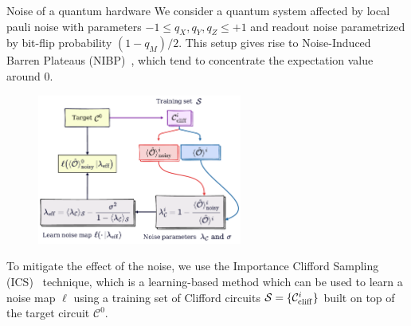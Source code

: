 \documentclass[20pt, final]{beamer}
\newlength{\colwidth}
\begin{document}
\begin{frame}[t]
\begin{columns}[t]
\begin{column}{\colwidth}
\begin{block}{Noise of a quantum hardware}
We consider a quantum system affected by local pauli noise with parameters 
$-1 \leq q_X, q_Y, q_Z \leq +1$ and readout noise parametrized by bit-flip probability 
$(1-q_M)/2$. This setup gives rise to Noise-Induced Barren Plateaus (NIBP)~\cite{nibp}, which tend 
to concentrate the expectation value around 0. 
    \begin{figure}
    \includegraphics[width=0.6\textwidth]{figures/ics.pdf}%
    \end{figure}
To mitigate the effect of the noise, we use the Importance Clifford Sampling (ICS)~\cite{ics}
technique, which is a learning-based method which can be used to learn a noise 
map $\ell$ using a training set of Clifford circuits $\mathcal{S}=\{\mathcal{C}^i_{\rm cliff}\}$
built on top of the target circuit $\mathcal{C}^0$.
\end{block}


\end{column}
\end{columns}
\end{frame}
\end{document}
